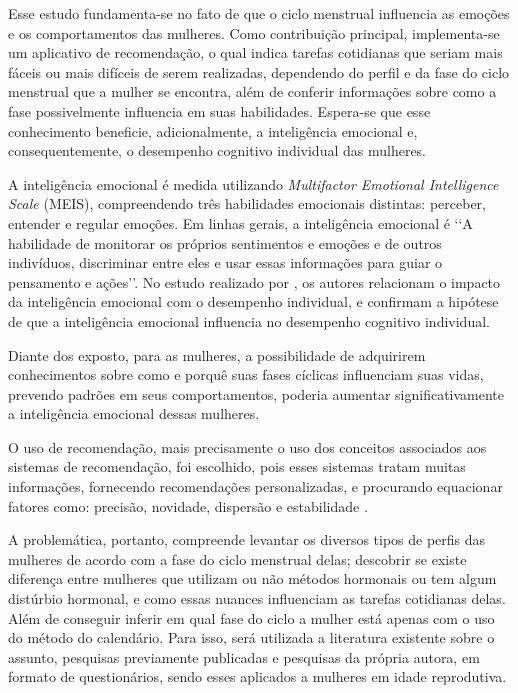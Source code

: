 Esse estudo fundamenta-se no fato de que o ciclo menstrual influencia as emoções e os comportamentos 
das mulheres. Como contribuição principal, implementa-se um aplicativo de recomendação, o qual 
indica tarefas cotidianas que seriam mais fáceis ou mais difíceis de serem realizadas, dependendo do 
perfil e da fase do ciclo menstrual que a mulher se encontra, além de conferir informações sobre como 
a fase possivelmente influencia em suas habilidades. Espera-se que esse conhecimento beneficie, 
adicionalmente, a inteligência emocional e, consequentemente, o desempenho cognitivo individual das 
mulheres. 

A inteligência emocional é medida utilizando \textit{Multifactor Emotional Intelligence Scale} (MEIS), 
compreendendo três habilidades emocionais distintas: perceber, entender e regular emoções. Em linhas 
gerais, a inteligência 
emocional é \lq \lq A habilidade de monitorar os próprios sentimentos e emoções e de outros indivíduos, 
discriminar entre eles e usar essas informações para guiar o pensamento e ações\rq \rq \cite{salovey1990}. 
No estudo realizado por , os autores relacionam o impacto da inteligência emocional 
com o desempenho individual, e confirmam a hipótese de 
que a inteligência emocional influencia no desempenho cognitivo individual. 

Diante dos exposto, para as mulheres, 
a possibilidade de adquirirem conhecimentos sobre como e porquê suas fases cíclicas influenciam suas vidas, 
prevendo padrões em seus comportamentos, poderia aumentar 
significativamente a inteligência emocional dessas mulheres. 


O uso de recomendação, mais precisamente o uso dos conceitos associados aos sistemas de recomendação, 
foi escolhido, pois esses sistemas tratam muitas informações, fornecendo recomendações personalizadas, 
e procurando equacionar fatores como: precisão, novidade, dispersão e estabilidade \cite{bobadilla2013}.


A problemática, portanto, compreende levantar os diversos tipos de perfis das mulheres de acordo com a 
fase do ciclo menstrual delas; descobrir se existe diferença entre mulheres que utilizam ou não métodos 
hormonais ou tem algum distúrbio hormonal, e como essas nuances influenciam as tarefas cotidianas delas. 
Além de conseguir inferir em qual fase do ciclo a mulher está apenas com o uso do método do calendário. 
Para isso, será utilizada a literatura existente sobre o assunto, pesquisas previamente publicadas e 
pesquisas da própria autora, em formato de questionários, sendo esses aplicados a mulheres em idade 
reprodutiva.


